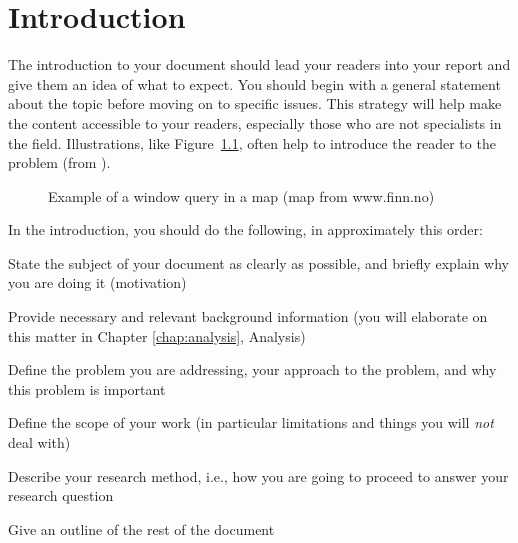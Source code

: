 
\chapter{Introduction}
\label{chap:intro}

The introduction to your document should lead your
readers into your report and give them an idea of what to expect.
You should
begin with a general statement about the topic before moving on
to specific issues. This strategy will help make the content
accessible to your readers, especially those who are not specialists
in the field. Illustrations, like Figure~\ref{fig:halwin}, often
help to introduce the reader to the problem (from \cite{kjeldsen05cor}).

\begin{figure}[h]
    \caption{Example of a window query in a map (map from www.finn.no)}
    \label{fig:halwin}
\end{figure}


In the introduction, you should do the following, in approximately this order:
\begin{compactitem}
  \item State the subject of your document as clearly as possible, and briefly explain why you are doing it (motivation)
    \item Provide necessary and relevant background information (you will elaborate on this matter in Chapter \ref{chap:analysis}, Analysis)
  \item Define the problem you are addressing, your approach to the problem, and why this problem is important
  \item Define the scope of your work (in particular limitations and things you will {\em not} deal with)
  \item Describe your research method, i.e., how you are going to proceed to answer your research question
  \item Give an outline of the rest of the document
\end{compactitem}

